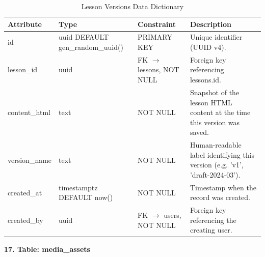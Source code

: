 \documentclass[12pt, oneside]{article} %
\newcommand{\tabbreak}{\hyphenpenalty=200\exhyphenpenalty=200\tolerance=4000\hbadness=10000\hspace{0pt}}
\begin{document}
\begin{table}[H]
\caption{Lesson Versions Data Dictionary}
\label{tab:dd_lesson_versions}
\vspace{-4mm}
\begin{center}
\renewcommand{\arraystretch}{1.15}
\scriptsize
\begin{tabular}{|>{\raggedright\arraybackslash\tabbreak}p{2.67cm}|>{\raggedright\arraybackslash\tabbreak}p{2.93cm}|>{\raggedright\arraybackslash\tabbreak}p{2.67cm}|>{\raggedright\arraybackslash\tabbreak}p{4.51cm}|}
\hline
\textbf{Attribute} & \textbf{Type} & \textbf{Constraint} & \textbf{Description} \\ \hline
id & uuid DEFAULT gen\_random\_uuid() & PRIMARY KEY & Unique identifier (UUID v4). \\ \hline
lesson\_id & uuid & FK $\rightarrow$ lessons, NOT NULL & Foreign key referencing lessons.id. \\ \hline
content\_html & text & NOT NULL & Snapshot of the lesson HTML content at the time this version was saved. \\ \hline
version\_name & text & NOT NULL & Human-readable label identifying this version (e.g. 'v1', 'draft-2024-03'). \\ \hline
created\_at & timestamptz DEFAULT now() & NOT NULL & Timestamp when the record was created. \\ \hline
created\_by & uuid & FK $\rightarrow$ users, NOT NULL & Foreign key referencing the creating user. \\ \hline
\end{tabular}
\end{center}
\end{table}

\textbf{17. Table: media\_assets}
\end{document}
